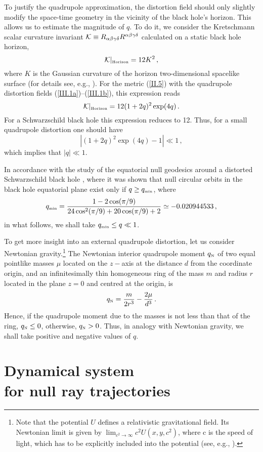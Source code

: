 \documentclass[twocolumn,showpacs,preprintnumbers,amsmath,amssymb,floatfix,nofootinbib]{revtex4-1}
\newcommand{\be}{\begin{equation}}
\newcommand{\ee}{\end{equation}}
\newcommand{\eq}[1]{(\ref{#1})}
\newcommand{\n}[1]{\label{#1}}
\newcommand{\ind}[1]{\mbox{\tiny #1}}
\begin{document}
To justify the quadrupole approximation, the distortion field should only slightly modify the space-time geometry in the vicinity of the black hole's horizon. This allows us to estimate the magnitude of $q$. To do it, we consider the Kretschmann scalar curvature invariant ${\cal K}\equiv R_{\alpha\beta\gamma\delta}R^{\alpha\beta\gamma\delta}$ calculated on a static black hole horizon,
\be\n{III.2}
{\cal K}|_{\ind{Horizon}}=12K^2\,,
\ee
where $K$ is the Gaussian curvature of the horizon two-dimensional spacelike surface (for details see, e.g., \cite{Frolov:2007xi,Abdolrahimi:2009db}). For the metric \eq{II.5} with the quadrupole distortion fields \eq{III.1a}--\eq{III.1b}, this expression reads
\be\n{III.3}
{\cal K}|_{\ind{Horizon}}=12(1+2q)^2\exp(4q)\,.
\ee
For a Schwarzschild black hole this expression reduces to 12. Thus, for a small quadrupole distortion one should have 
\be\n{III.4}
\left|(1+2q)^2\exp(4q)-1\right|\ll1\,,
\ee
which implies that $|q|\ll1$.

In accordance with the study of the equatorial null geodesics around a distorted Schwarzschild black hole \cite{Shoom:2015slu}, where it was shown that null circular orbits in the black hole equatorial plane exist only if $q\ge q_{\ind{min}}$, where  
\be\n{III.5}
q_{\ind{min}}=\frac{1-2\cos(\pi/9)}{24\cos^2(\pi/9)+20\cos(\pi/9)+2}\simeq -0.020944533\,,
\ee
in what follows, we shall take $q_{\ind{min}}\leq q\ll1$. 

To get more insight into an external quadrupole distortion, let us consider Newtonian gravity.\footnote{Note that the potential $U$ defines a relativistic gravitational field. Its Newtonian limit is given by $\lim_{c^2\to \infty}c^2U(x, y, c^2
)$, where c is the speed of light, which has to be explicitly included into the potential (see, e.g., \cite{Quevedo:1989rfm,Ehlers}).} The Newtonian interior quadrupole moment $q_{\ind{N}}$ of two equal pointlike masses $\mu$ located on the $z-$axis at the distance $d$ from the coordinate origin, and an infinitesimally thin homogeneous ring of the mass $m$ and radius $r$ located in the plane $z=0$ and centred at the origin, is
\be\n{III.6}
q_{\ind{N}}=\frac{m}{2r^3}-\frac{2\mu}{d^3}\,.
\ee  
Hence, if the quadrupole moment due to the masses is not less than that of the ring, $q_{\ind{N}}\leq0$, otherwise, $q_{\ind{N}}>0$. Thus, in analogy with Newtonian gravity, we shall take positive and negative values of $q$. 

\section{Dynamical system\\ for null ray trajectories}
\end{document}
